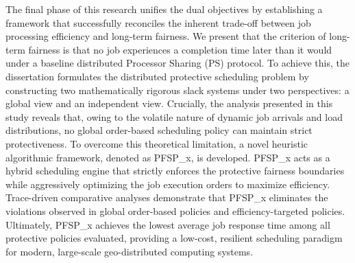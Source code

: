 \documentclass[12pt,a4paper]{Thesis} %
\begin{document}
The final phase of this research unifies the dual objectives by establishing a framework that successfully reconciles the inherent trade-off between job processing efficiency and long-term fairness. We present that the criterion of long-term fairness is that no job experiences a completion time later than it would under a baseline distributed Processor Sharing (PS) protocol. %
To achieve this, the dissertation formulates the distributed protective scheduling problem by constructing two mathematically rigorous slack systems under two perspectives: a global view and an independent view. Crucially, the analysis presented in this study reveals that, owing to the volatile nature of dynamic job arrivals and load distributions, no global order-based scheduling policy can maintain strict protectiveness. To overcome this theoretical limitation, a novel heuristic algorithmic framework, denoted as PFSP\_x, is developed. PFSP\_x acts as a hybrid scheduling engine that strictly enforces the protective fairness boundaries while aggressively optimizing the job execution orders to maximize efficiency. Trace-driven comparative analyses demonstrate that PFSP\_x eliminates the violations observed in global order-based policies and efficiency-targeted policies. Ultimately, PFSP\_x achieves the lowest average job response time among all protective policies evaluated, providing a low-cost, resilient scheduling paradigm for modern, large-scale geo-distributed computing systems.
\end{document}
